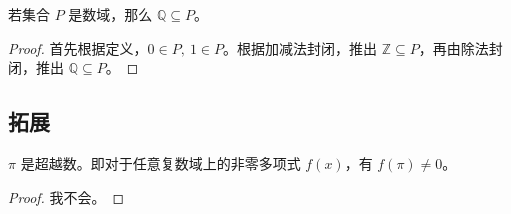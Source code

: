 \begin{conclusion}
	若集合 $P$ 是数域，那么 $\mathbb{Q} \subseteq P$。

	\begin{proof}
		首先根据定义，$0 \in P,\ 1 \in P$。根据加减法封闭，推出 $\mathbb{Z} \subseteq P$，再由除法封闭，推出 $\mathbb{Q} \subseteq P$。
	\end{proof}
\end{conclusion}

\subsection{拓展}

\begin{theorem}[林德曼定理]
	$\pi$ 是超越数。即对于任意复数域上的非零多项式 $f(x)$，有 $f(\pi) \neq 0$。

	\begin{proof}
		我不会。
	\end{proof}
\end{theorem}